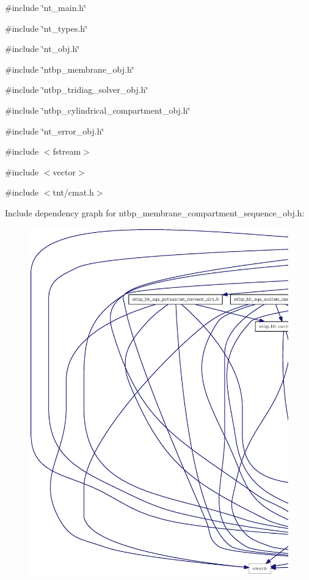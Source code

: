 {\ttfamily \#include \char`\"{}nt\_\-main.h\char`\"{}}\par
{\ttfamily \#include \char`\"{}nt\_\-types.h\char`\"{}}\par
{\ttfamily \#include \char`\"{}nt\_\-obj.h\char`\"{}}\par
{\ttfamily \#include \char`\"{}ntbp\_\-membrane\_\-obj.h\char`\"{}}\par
{\ttfamily \#include \char`\"{}ntbp\_\-tridiag\_\-solver\_\-obj.h\char`\"{}}\par
{\ttfamily \#include \char`\"{}ntbp\_\-cylindrical\_\-compartment\_\-obj.h\char`\"{}}\par
{\ttfamily \#include \char`\"{}nt\_\-error\_\-obj.h\char`\"{}}\par
{\ttfamily \#include $<$fstream$>$}\par
{\ttfamily \#include $<$vector$>$}\par
{\ttfamily \#include $<$tnt/cmat.h$>$}\par
Include dependency graph for ntbp\_\-membrane\_\-compartment\_\-sequence\_\-obj.h:
\nopagebreak
\begin{figure}[H]
\begin{center}
\leavevmode
\includegraphics[width=400pt]{ntbp__membrane__compartment__sequence__obj_8h__incl}
\end{center}
\end{figure}
